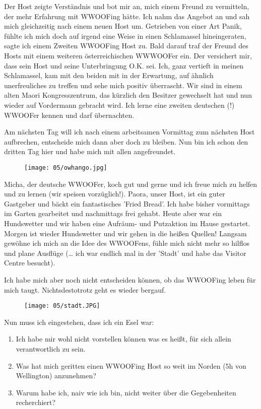 Der Host zeigte Verständnis und bot mir an, mich einem Freund zu
vermitteln, der mehr Erfahrung mit WWOOFing hätte. Ich nahm das
Angebot an und sah mich gleichzeitig nach einem neuen Host
um. Getrieben von einer Art Panik, fühlte ich mich doch auf irgend
eine Weise in einen Schlamassel hineingeraten, sagte ich einem Zweiten
WWOOFing Host zu. Bald darauf traf der Freund des Hosts mit einem
weiteren österreichischen WWWOOFer ein. Der versichert mir, dass sein
Host und seine Unterbringung O.K. sei. Ich, ganz vertieft in meinen
Schlamassel, kam mit den beiden mit in der Erwartung, auf ähnlich
unerfreuliches zu treffen und sehe mich positiv überrascht. Wir sind
in einem alten Maori Kongresszentrum, das kürzlich den Besitzer
gewechselt hat und nun wieder auf Vordermann gebracht wird. Ich lerne
eine zweiten deutschen (!) WWOOFer kennen und darf übernachten.

Am nächsten Tag will ich nach einem arbeitsamen Vormittag zum nächsten
Host aufbrechen, entscheide mich dann aber doch zu bleiben. Nun bin
ich schon den dritten Tag hier und habe mich mit allen
angefreundet.
\begin{figure}[h]
  \centering
  \texttt{[image: 05/owhango.jpg]}
\end{figure}

Micha, der deutsche WWOOFer, koch gut und gerne und ich
freue mich zu helfen und zu lernen (wir speisen vorzüglich!). Paora,
unser Host, ist ein guter Gastgeber und bäckt ein fantastisches 'Fried
Bread'. Ich habe bisher vormittags im Garten gearbeitet und
nachmittags frei gehabt. Heute aber war ein Hundswetter und wir haben
eine Aufräum- und Putzaktion im Hause gestartet. Morgen ist wieder
Hundswetter und wir gehen in die heißen Quellen! Langsam gewöhne ich
mich an die Idee des WWOOFens, fühle mich nicht mehr so hilflos und
plane Ausflüge (\ldots{} ich war endlich mal in der 'Stadt' und habe
das Visitor Centre besucht).

Ich habe mich aber noch nicht entscheiden
können, ob das WWOOFing leben für mich taugt.  Nichtsdestotrotz geht
es wieder bergauf.
\begin{figure}[h]
  \centering
  \texttt{[image: 05/stadt.JPG]}
\end{figure}

Nun muss ich eingestehen, dass ich ein Esel war:

\begin{enumerate}
\tightlist
\item
  Ich habe mir wohl nicht vorstellen können was es heißt, für sich
  allein verantwortlich zu sein.
\item
  Was hat mich geritten einen WWOOFing Host so weit im Norden (5h von
  Wellington) anzunehmen?
\item
  Warum habe ich, naiv wie ich bin, nicht weiter über die Gegebenheiten
  recherchiert?
\end{enumerate}

